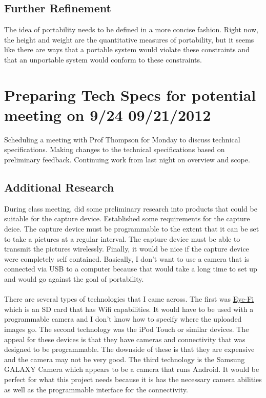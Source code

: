 \documentclass[]{article}
\begin{document}
		\subsection{Further Refinement}
			The idea of portability needs to be defined in a more concise fashion. Right now, the height and weight are the quantitative measures of portability, but it seems like there are ways that a portable system would violate these constraints and that an unportable system would conform to these constraints. 
				
	
	\section{Preparing Tech Specs for potential meeting on 9/24 09/21/2012}
		Scheduling a meeting with Prof Thompson for Monday to discuss technical specifications. Making changes to the technical specifications based on preliminary feedback. Continuing work from last night on overview and scope.
		
		\subsection{Additional Research}
			During class meeting, did some preliminary research into products that could be suitable for the capture device. Established some requirements for the capture deice. The capture device must be programmable to the extent that it can be set to take a pictures at a regular interval. The capture device must be able to transmit the pictures wirelessly. Finally, it would be nice if the capture device were completely self contained. Basically, I don't want to use a camera that is connected via USB to a computer because that would take a long time to set up and would go against the goal of portability. \\
			\\
			There are several types of technologies that I came across. The first was \href{http://www.eye.fi/}{Eye-Fi} which is an SD card that has Wifi capabilities. It would have to be used with a programmable camera and I don't know how to specify where the uploaded images go. The second technology was the iPod Touch or similar devices. The appeal for these devices is that they have cameras and connectivity that was designed to be programmable. The downside of these is that they are expensive and the camera may not be very good. The third technology is the Samsung GALAXY Camera which appears to be a camera that runs Android. It would be perfect for what this project needs because it is has the necessary camera abilities as well as the programmable interface for the connectivity. 
			
\end{document}
